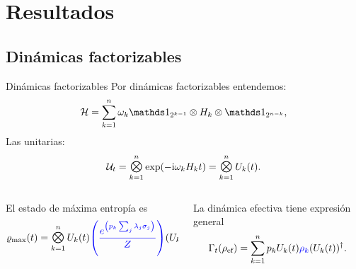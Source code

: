 \section{Resultados}
\subsection{Dinámicas factorizables}
\begin{frame}{Dinámicas factorizables}
    Por dinámicas factorizables entendemos\pause:
    \begin{equation}
        \mcH=\sum_{k=1}^{n}\omega_{k}\Id_{2^{k-1}}\otimes H_{k} \otimes \Id_{2^{n-k}},\nonumber
    \end{equation}
    Las unitarias:\pause
    \begin{equation}
        \mcU_{t}=\Motimes_{k=1}^{n}\text{exp}\qty(-\rmi\omega_{k}H_{k}t)=\Motimes_{k=1}^{n} U_{k}(t).\nonumber
    \end{equation}\pause
    \begin{columns}
        \begin{column}{0.5\textwidth}
            El estado de máxima entropía es\pause
            \begin{equation}
                \varrho_{\max}(t)=\Motimes_{k=1}^{n}U_{k}(t) {\color{blue}\qty(\frac{e^{\qty(p_{k}\sum_{j}\lambda_{j}\pauli{j})}}{Z})} (U_{k}(t))^{\dag}\nonumber
            \end{equation}
        \end{column}
        \pause
        \begin{column}{0.5\textwidth}
            La dinámica efectiva tiene expresión general\pause
            \begin{equation}
                \Gamma_{t}(\rho_{\text{ef}})=\sum_{k=1}^{n}p_{k} U_{k}(t) {\color{blue}\rho_{k}} (U_{k}(t))^{\dag}.\nonumber
            \end{equation}
        \end{column}
    \end{columns}
\end{frame}

